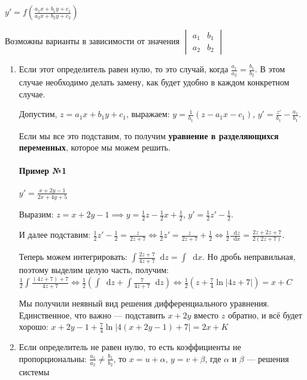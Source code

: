 \documentclass{article}
\newcommand*\diff{\mathop{}\!\mathrm{d}}
\begin{document}
$y' = f(\frac{a_1 x + b_1 y + c_1}{a_2 x + b_2 y + c_2})$

Возможны варианты в зависимости от значения $\begin{vmatrix} a_1 & b_1 \\ a_2 & b_2 \end{vmatrix}$

\begin{enumerate}
    \item Если этот определитель равен нулю, то это случай, когда $\frac{a_1}{a_2} = \frac{b_1}{b_2}$. В этом случае необходимо делать замену, как будет удобно в каждом конкретном случае.
    
    Допустим, $z = a_1 x + b_1 y + c_1$, выражаем: $y = \frac{1}{b_1} (z - a_1 x - c_1)$, $y' = \frac{z'}{b_1} - \frac{a_1}{b_1}$. 
    
    Если мы все это подставим, то получим \textbf{уравнение в разделяющихся переменных}, которое мы можем решить.

    \paragraph{Пример №1} $y' = \frac{x + 2y - 1}{2x + 4y + 5}$

    Выразим: $z = x + 2y - 1 \implies y = \frac{1}{2} z - \frac{1}{2} x + \frac{1}{2}$, $y' = \frac{1}{2} z' - \frac{1}{2}$. 
    
    И далее подставим: $\frac{1}{2} z' - \frac{1}{2} = \frac{z}{2z + 7} \Longleftrightarrow \frac{1}{2} z' = \frac{z}{2z + 7} + \frac{1}{2} \Longleftrightarrow \frac{1}{2} \frac{\diff z}{\diff x} = \frac{2z + 2z + 7}{2 (2z + 7)}$.

    Теперь можем интегрировать: $\int \frac{2 z + 7}{4 z + 7} \diff z = \int \diff x$. Но дробь неправильная, поэтому выделим целую часть, получим: $\frac{1}{2} \int \frac{(4z + 7) + 7}{4z + 7} \Longleftrightarrow \frac{1}{2} (\int \diff z + \int \frac{7}{4z + 7} \diff z) \Longleftrightarrow \frac{1}{2} (z + \frac{7}{4} \ln |4z + 7|) = x + C$

    Мы получили неявный вид решения дифференциального уравнения. Единственное, что важно — подставить $x + 2y$ вместо $z$ обратно, и всё будет хорошо: $x + 2y - 1 + \frac{7}{4} \ln |4 (x + 2y - 1) + 7| = 2x + K$
    \item Если определитель не равен нулю, то есть коэффициенты не пропорциональны: $\frac{a_1}{a_2} \ne \frac{b_1}{b_2}$, то $x = u + \alpha$, $y = v + \beta$, где $\alpha$ и $\beta$ — решения системы
    

\end{enumerate}
\end{document}
